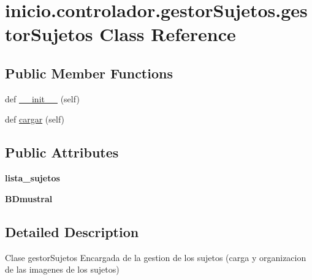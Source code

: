 \hypertarget{classinicio_1_1controlador_1_1gestor_sujetos_1_1gestor_sujetos}{}\section{inicio.\+controlador.\+gestor\+Sujetos.\+gestor\+Sujetos Class Reference}
\label{classinicio_1_1controlador_1_1gestor_sujetos_1_1gestor_sujetos}
\subsection*{Public Member Functions}
\begin{DoxyCompactItemize}
\item 
def \hyperlink{classinicio_1_1controlador_1_1gestor_sujetos_1_1gestor_sujetos_a45b869809ff0f469209290aa691d9de6}{\+\_\+\+\_\+init\+\_\+\+\_\+} (self)
\item 
def \hyperlink{classinicio_1_1controlador_1_1gestor_sujetos_1_1gestor_sujetos_ad513d4a6c28ac01bcbe4a00542f2a6d6}{cargar} (self)
\end{DoxyCompactItemize}
\subsection*{Public Attributes}
\begin{DoxyCompactItemize}
\item 
\mbox{\label{classinicio_1_1controlador_1_1gestor_sujetos_1_1gestor_sujetos_a36140d0a0795f5664476afd242cf56fa}} 
{\bfseries lista\+\_\+sujetos}
\item 
\mbox{\label{classinicio_1_1controlador_1_1gestor_sujetos_1_1gestor_sujetos_a747e2510d3ec40173426dc4cdc165860}} 
{\bfseries B\+Dmustral}
\end{DoxyCompactItemize}


\subsection{Detailed Description}
\begin{DoxyVerb}Clase gestorSujetos
Encargada de la gestion de los sujetos (carga y organizacion de las imagenes de los sujetos)
\end{DoxyVerb}
 

